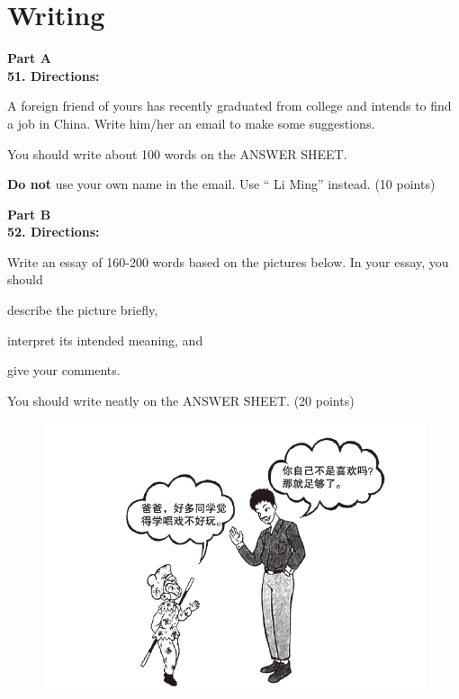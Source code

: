 \newpage

\section{Writing}



\noindent
\textbf{Part A}\\
\textbf{51. Directions:}


A foreign friend of yours has recently graduated from college and
intends to find a job in China. Write him/her an email to make some
suggestions.


You should write about 100 words on the ANSWER SHEET.



\textbf{Do not} use your own name in the email. Use `` Li Ming''
instead. (10 points)

\vspace{2em}

\noindent
\textbf{Part B}\\
\textbf{52. Directions:}



Write an essay of 160-200 words based on the pictures below. In
your essay, you should


\begin{listwrite}
	\item 
	describe the picture briefly,
	
	\item 
	interpret its intended meaning, and
	
	\item 
	give your comments.
\end{listwrite}

You should write neatly on the ANSWER SHEET. (20 points)


\begin{figure}[h!]
	\centering
	\includegraphics[width=0.64\linewidth]{picture/2021.png}
\end{figure}




